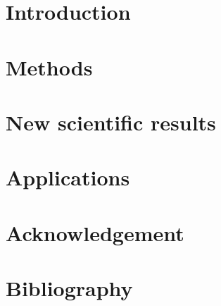 \documentclass[twoside]{article}
\begin{document}


\section{Introduction}

 
\section{Methods}


\section{New scientific results}


\section{Applications}


\pagebreak
\section*{Acknowledgement}


\cleardoublepage
\section*{Bibliography}

\end{document}
